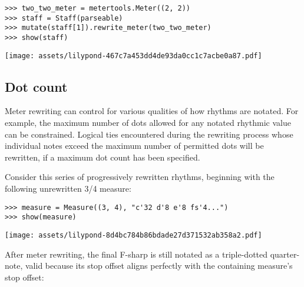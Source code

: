 \begin{abjadbookoutput}
\begin{singlespacing}
\vspace{-0.5\baselineskip}
\begin{lstlisting}
>>> two_two_meter = metertools.Meter((2, 2))
>>> staff = Staff(parseable)
>>> mutate(staff[1]).rewrite_meter(two_two_meter)
>>> show(staff)
\end{lstlisting}
\noindent\texttt{[image: assets/lilypond-467c7a453dd4de93da0cc1c7acbe0a87.pdf]}
\end{singlespacing}
\end{abjadbookoutput}

\subsection{Dot count} %

Meter rewriting can control for various qualities of how rhythms are notated.
For example, the maximum number of dots allowed for any notated rhythmic value
can be constrained. Logical ties encountered during the rewriting process whose
individual notes exceed the maximum number of permitted dots will be rewritten,
if a maximum dot count has been specified.

Consider this series of progressively rewritten rhythms, beginning with the
following unrewritten 3/4 measure:

\begin{comment}
<abjad>
measure = Measure((3, 4), "c'32 d'8 e'8 fs'4...")
show(measure)
</abjad>
\end{comment}

\begin{abjadbookoutput}
\begin{singlespacing}
\vspace{-0.5\baselineskip}
\begin{lstlisting}
>>> measure = Measure((3, 4), "c'32 d'8 e'8 fs'4...")
>>> show(measure)
\end{lstlisting}
\noindent\texttt{[image: assets/lilypond-8d4bc784b86bdade27d371532ab358a2.pdf]}
\end{singlespacing}
\end{abjadbookoutput}

\noindent After meter rewriting, the final F-sharp is still notated as a
triple-dotted quarter-note, valid because its stop offset aligns perfectly with
the containing measure's stop offset:


